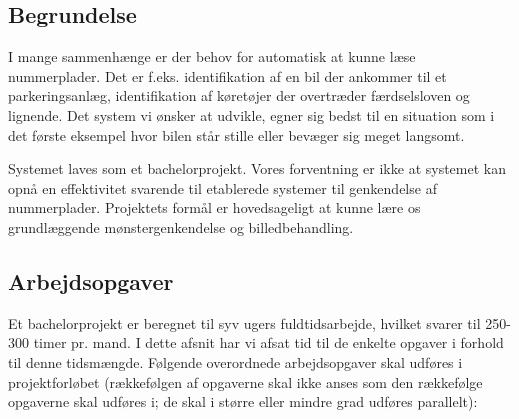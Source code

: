 \documentclass[10pt,a4paper,final]{report}
\begin{document}





\subsection*{Begrundelse}
I mange sammenhænge er der behov for automatisk at kunne læse nummerplader. Det er f.eks. identifikation af en bil der ankommer til et parkeringsanlæg, identifikation af køretøjer der overtræder færdselsloven og lignende. Det system vi ønsker at udvikle, egner sig bedst til en situation som i det første eksempel hvor bilen står stille eller bevæger sig meget langsomt.

Systemet laves som et bachelorprojekt. Vores forventning er ikke at systemet kan opnå en effektivitet svarende til etablerede systemer til genkendelse af nummerplader. Projektets formål er hovedsageligt at kunne lære os grundlæggende mønstergenkendelse og billedbehandling.

	
\subsection*{Arbejdsopgaver}
Et bachelorprojekt er beregnet til syv ugers fuldtidsarbejde, hvilket svarer til 250-300 timer pr. mand. I dette afsnit har vi afsat tid til de enkelte opgaver i forhold til denne tidsmængde. Følgende overordnede arbejdsopgaver skal udføres i projektforløbet (rækkefølgen af opgaverne skal ikke anses som den rækkefølge opgaverne skal udføres i; de skal i større eller mindre grad udføres parallelt):
\end{document}
